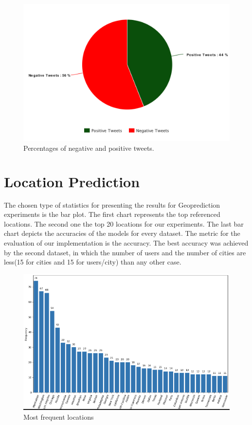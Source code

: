 \documentclass[12pt,svgnames]{report}
\begin{document}
\begin{figure}[H]
	\centering
	\includegraphics[scale=0.6]{pie_chart}
	\caption{Percentages of negative and positive tweets.}
	\label{fig:pie_chart}
\end{figure}

\section*{Location Prediction}
The chosen type of statistics for presenting the results for Geoprediction experiments is the bar plot. The first chart represents the top referenced locations. The second one the top 20 locations for our experiments. The last bar chart depicts the accuracies of the models for every dataset. The metric for the evaluation of our implementation is the accuracy. The best accuracy was achieved by the second dataset, in which the number of users and the number of cities are less(15 for cities and 15 for users/city) than any other case.

\begin{figure}[H]
	\centering
	\includegraphics[scale = 0.5]{toplocations.png}
	\caption{Most frequent locations}
\end{figure}
\end{document}
